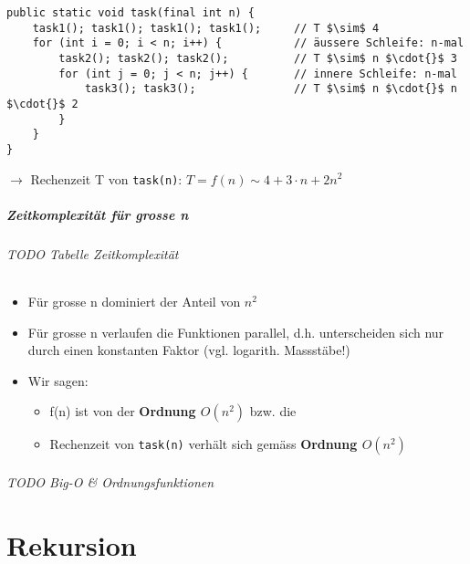 \documentclass[10pt,a4paper]{article}
\begin{document}
\lstset{language=Java}
\begin{lstlisting}[mathescape]
public static void task(final int n) {
    task1(); task1(); task1(); task1();     // T $\sim$ 4
    for (int i = 0; i < n; i++) {           // äussere Schleife: n-mal
        task2(); task2(); task2();          // T $\sim$ n $\cdot{}$ 3
        for (int j = 0; j < n; j++) {       // innere Schleife: n-mal
            task3(); task3();               // T $\sim$ n $\cdot{}$ n $\cdot{}$ 2
        }
    }
}
\end{lstlisting}
$\rightarrow$ Rechenzeit T von \texttt{task(n)}: $T=f(n)\sim 4+3\cdot n+2n^2$

\subsubsection{Zeitkomplexität für grosse n}
\paragraph{TODO Tabelle Zeitkomplexität}
\begin{itemize}[noitemsep,topsep=0pt,leftmargin=*]
    \item Für grosse n dominiert der Anteil von \textbf{$n^2$}
    \item Für grosse n verlaufen die Funktionen parallel, d.h. unterscheiden sich nur durch einen konstanten Faktor (vgl. logarith. Massstäbe!)
    \item Wir sagen:
    \begin{itemize}[noitemsep,topsep=0pt,leftmargin=*]
        \item f(n) ist von der \textbf{Ordnung $O(n^2)$} bzw. die
        \item Rechenzeit von \texttt{task(n)} verhält sich gemäss \textbf{Ordnung $O(n^2)$}
    \end{itemize}
\end{itemize}
\paragraph{TODO Big-O \& Ordnungsfunktionen}

\part{Rekursion}
\end{document}
